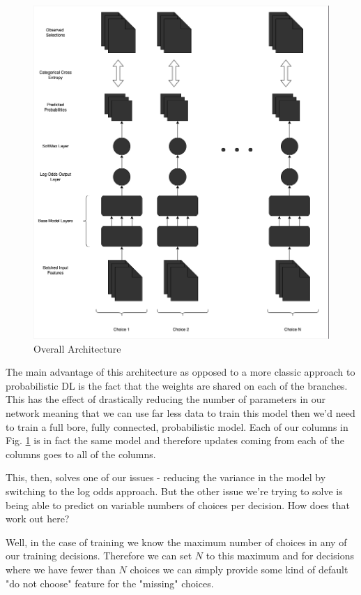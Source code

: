 \documentclass[11pt]{article}
\begin{document}
\begin{figure}[h!] 
  \includegraphics[width=\linewidth]{logarch.png}
  \caption{Overall Architecture}
  \label{fig:logarch}
\end{figure}

The main advantage of this architecture as opposed to a more classic approach to probabilistic DL is the fact that the weights are shared on each of the branches. This has the effect of drastically reducing the number of parameters in our network meaning that we can use far less data to train this model then we'd need to train a full bore, fully connected, probabilistic model. Each of our columns in Fig. \ref{fig:logarch} is in fact the same model and therefore updates coming from each of the columns goes to all of the columns.

This, then, solves one of our issues - reducing the variance in the model by switching to the log odds approach. But the other issue we're trying to solve is being able to predict on variable numbers of choices per decision. How does that work out here?\newline

Well, in the case of training we know the maximum number of choices in any of our training decisions. Therefore we can set $N$ to this maximum and for decisions where we have fewer than $N$ choices we can simply provide some kind of default "do not choose" feature for the "missing" choices. 
\end{document}
